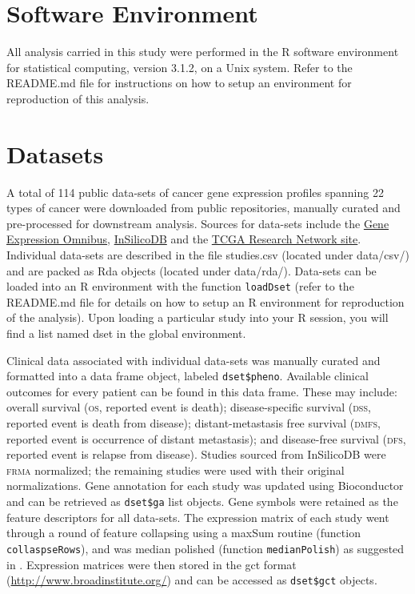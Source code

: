 \section{Software Environment}
All analysis carried in this study were performed in the \textsf{R} software
environment for statistical computing,\cite{r-manual} version 3.1.2, on a
\textsf{Unix} system.  Refer to the \textsf{README.md} file for instructions on
how to setup an environment for reproduction of this analysis.

\section{Datasets}
A total of 114 public data-sets of cancer gene expression profiles spanning 22
types of cancer were downloaded from public repositories, manually curated and
pre-processed for downstream analysis.  Sources for data-sets include the
\href{http://www.ncbi.nlm.nih.gov/geo/}{Gene Expression
  Omnibus}\cite{edgar_gene_2002},
\href{https://insilicodb.com/}{InSilicoDB}\cite{taminau_insilicodb:_2011} and
the \href{http://cancergenome.nih.gov/}{TCGA Research Network site}.  Individual
data-sets are described in the file \textsf{studies.csv} (located under
\textsf{data/csv/}) and are packed as \textsf{Rda} objects (located under
\textsf{data/rda/}).  Data-sets can be loaded into an \textsf{R} environment
with the function \texttt{loadDset} (refer to the README.md file for details on
how to setup an \textsf{R} environment for reproduction of the analysis).  Upon
loading a particular study into your \textsf{R} session, you will find a list
named \textsf{dset} in the global environment.

Clinical data associated with individual data-sets was manually curated and
formatted into a \textsf{data frame} object, labeled \texttt{dset\$pheno}.
Available clinical outcomes for every patient can be found in this \textsf{data
  frame}.  These may include: overall survival (\textsc{os}, reported event is
death); disease-specific survival (\textsc{dss}, reported event is death from
disease); distant-metastasis free survival (\textsc{dmfs}, reported event is
occurrence of distant metastasis); and disease-free survival (\textsc{dfs},
reported event is relapse from disease).  Studies sourced from InSilicoDB were
\textsc{frma} normalized\cite{mccall_frozen_2010}; the remaining studies were
used with their original normalizations.  Gene annotation for each study was
updated using Bioconductor and can be retrieved as \texttt{dset\$ga}
\textsf{list} objects.  Gene symbols were retained as the feature descriptors
for all data-sets.  The expression matrix of each study went through a round of
feature collapsing using a maxSum routine (function
\texttt{collaspseRows})\cite{miller_strategies_2011}, and was median polished
(function \texttt{medianPolish}) as suggested in
\cite{ramaswamy_molecular_2003,venet_most_2011}.  Expression matrices were then
stored in the \textsf{gct} format
(\href{http://www.broadinstitute.org/cancer/software/genepattern/gp\_guides/file-formats/sections/gct}{http://www.broadinstitute.org/})
and can be accessed as \texttt{dset\$gct} objects.

